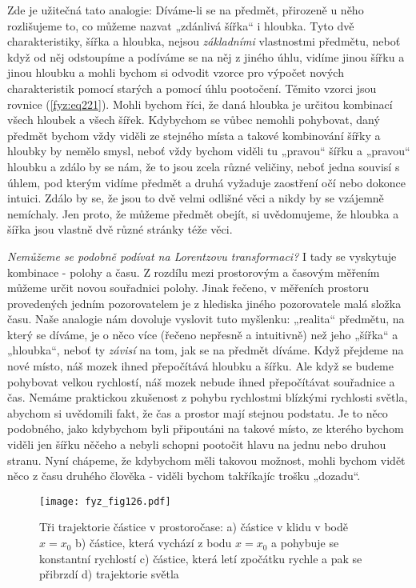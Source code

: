     Zde je užitečná tato analogie: Díváme-li se na předmět, přirozeně u něho rozlišujeme to, co
    můžeme nazvat „zdánlivá šířka“ i hloubka. Tyto dvě charakteristiky, šířka a hloubka, nejsou
    \emph{základními} vlastnostmi předmětu, neboť když od něj odstoupíme a podíváme se na něj z
    jiného úhlu, vidíme jinou šířku a jinou hloubku a mohli bychom si odvodit vzorce pro výpočet
    nových charakteristik pomocí starých a pomocí úhlu pootočení. Těmito vzorci jsou rovnice
    (\ref{fyz:eq221}). Mohli bychom říci, že daná hloubka je určitou kombinací všech hloubek a všech
    šířek. Kdybychom se vůbec nemohli pohybovat, daný předmět bychom vždy viděli ze stejného místa a
    takové kombinování šířky a hloubky by nemělo smysl, neboť vždy bychom viděli tu „pravou“ šířku a
    „pravou“ hloubku a zdálo by se nám, že to jsou zcela různé veličiny, neboť jedna souvisí s
    úhlem, pod kterým vidíme předmět a druhá vyžaduje zaostření očí nebo dokonce intuici. Zdálo by
    se, že jsou to dvě velmi odlišné věci a nikdy by se vzájemně nemíchaly. Jen proto, že můžeme
    předmět obejít, si uvědomujeme, že hloubka a šířka jsou vlastně dvě různé stránky téže věci.
     
    \emph{Nemůžeme se podobně podívat na Lorentzovu transformaci?} I tady se vyskytuje kombinace - 
    polohy a času. Z rozdílu mezi prostorovým a časovým měřením můžeme určit novou souřadnici 
    polohy. Jinak řečeno, v měřeních prostoru provedených jedním pozorovatelem je z hlediska jiného 
    pozorovatele malá složka času. Naše analogie nám dovoluje vyslovit tuto myšlenku: „realita“ 
    předmětu, na který se díváme, je o něco více (řečeno nepřesně a intuitivně) než jeho „šířka“ a 
    „hloubka“, neboť ty \emph{závisí} na tom, jak se na předmět díváme. Když přejdeme na nové 
    místo, náš mozek ihned přepočítává hloubku a šířku. Ale když se budeme pohybovat velkou 
    rychlostí, náš mozek nebude ihned přepočítávat souřadnice a čas. Nemáme praktickou zkušenost z 
    pohybu rychlostmi blízkými rychlosti světla, abychom si uvědomili fakt, že čas a prostor mají 
    stejnou podstatu. Je to něco podobného, jako kdybychom byli připoutáni na takové místo, ze 
    kterého bychom viděli jen šířku něčeho a nebyli schopni pootočit hlavu na jednu nebo druhou 
    stranu. Nyní chápeme, že kdybychom měli takovou možnost, mohli bychom vidět něco z času druhého 
    člověka - viděli bychom takříkajíc trošku „dozadu“.

    \begin{figure}[ht!]  %
      \centering
      \texttt{[image: fyz\_fig126.pdf]}
      \caption{Tři trajektorie částice v prostoročase: a) částice v klidu v bodě \(x = x_0\)
               b) částice, která vychází z bodu \(x = x_0\) a pohybuje se konstantní rychlostí
               c) částice, která letí zpočátku rychle a pak se přibrzdí d) trajektorie světla 
               \cite[s.~238]{Feynman01}}
      \label{fyz:fig126}
    \end{figure}
    
